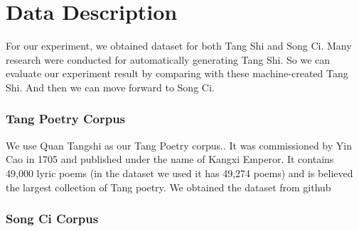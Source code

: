 \section{Data Description}   
For our experiment, we obtained dataset for both Tang Shi and Song Ci. Many research were conducted for automatically generating Tang Shi. So we can evaluate our experiment result by comparing with these machine-created Tang Shi. And then we can move forward to Song Ci.
\subsubsection{Tang Poetry Corpus}
We use Quan Tangshi as our Tang Poetry corpus.\cite{1960quantangshi}. It was commissioned by Yin Cao in 1705 and published under the name of Kangxi Emperor. It contains 49,000 lyric poems (in the dataset we used it has 49,274 poems) and is believed the largest collection of Tang poetry. We obtained the dataset from github
\subsubsection{Song Ci Corpus}